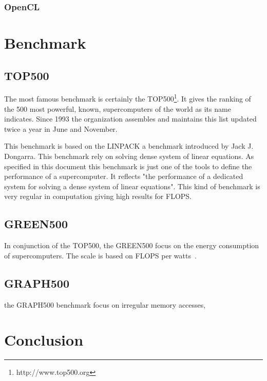 \subsubsection{OpenCL}


\section{Benchmark}

\subsection{TOP500}
The most famous benchmark is certainly the TOP500\footnote{http://www.top500.org}. 
It gives the ranking of the 500 most powerful, known, supercomputers of the world as its name indicates.
Since 1993 the organization assembles and maintains this list updated twice a year in June and November.

This benchmark is based on the LINPACK\cite{dongarra1994top500} a benchmark introduced by Jack J. Dongarra.
This benchmark rely on solving  dense system of linear equations. 
As specified in this document this benchmark is just one of the tools to define the performance of a supercomputer. 
It reflects "the performance of a dedicated system for solving a dense system of linear equations".
This kind of benchmark is very regular in computation giving high results for FLOPS. 


\subsection{GREEN500}
In conjunction of the TOP500, the GREEN500 focus on the energy consumption of supercomputers. 
The scale is based on FLOPS per watts~\cite{feng2007green500}.

\subsection{GRAPH500}
the GRAPH500 benchmark focus on irregular memory accesses, 



\section{Conclusion}


